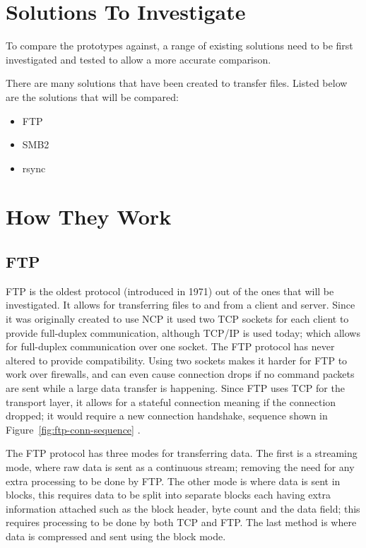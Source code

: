 \section{Solutions To Investigate}
To compare the prototypes against, a range of existing solutions need to be first investigated and tested to allow a more accurate comparison.

There are many solutions that have been created to transfer files. Listed below are the solutions that will be compared:

\begin{itemize}
	\item FTP
	\item SMB2
	\item rsync
\end{itemize}


\section{How They Work}
\subsection*{FTP}
FTP is the oldest protocol (introduced in 1971) out of the ones that will be investigated. It allows for transferring files to and from a client and server. Since it was originally created to use NCP it used two TCP sockets for each client to provide full-duplex communication, although TCP/IP is used today; which allows for full-duplex communication over one socket. The FTP protocol has never altered to provide compatibility. Using two sockets makes it harder for FTP to work over firewalls, and can even cause connection drops if no command packets are sent while a large data transfer is happening. Since FTP uses TCP for the transport layer, it allows for a stateful connection meaning if the connection dropped; it would require a new connection handshake, sequence shown in Figure~\ref{fig:ftp-conn-sequence} \parencite{ftp-rfc959}.

The FTP protocol has three modes for transferring data. The first is a streaming mode, where raw data is sent as a continuous stream; removing the need for any extra processing to be done by FTP. The other mode is where data is sent in blocks, this requires data to be split into separate blocks each having extra information attached such as the block header, byte count and the data field; this requires processing to be done by both TCP and FTP. The last method is where data is compressed and sent using the block mode.

